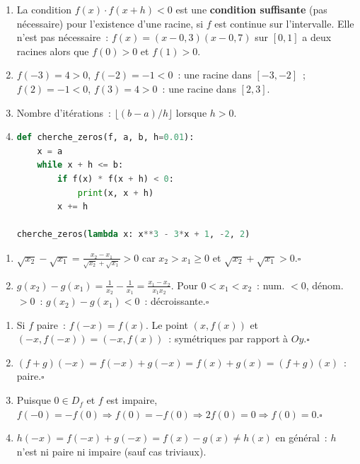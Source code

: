 \begin{enumerate}
  \item La condition $f(x)\cdot f(x+h)<0$ est une \textbf{condition suffisante} (pas n\'ecessaire)
        pour l'existence d'une racine, si $f$ est continue sur l'intervalle.
        Elle n'est pas n\'ecessaire~: $f(x)=(x-0{,}3)(x-0{,}7)$ sur $[0,1]$
        a deux racines alors que $f(0)>0$ et $f(1)>0$.
  \item $f(-3)=4>0$, $f(-2)=-1<0$~: une racine dans $[-3,-2]$~;
        $f(2)=-1<0$, $f(3)=4>0$~: une racine dans $[2,3]$.
  \item Nombre d'it\'erations~: $\lfloor(b-a)/h\rfloor$ lorsque $h>0$.
  \item
\begin{lstlisting}[language=Python]
def cherche_zeros(f, a, b, h=0.01):
    x = a
    while x + h <= b:
        if f(x) * f(x + h) < 0:
            print(x, x + h)
        x += h

cherche_zeros(lambda x: x**3 - 3*x + 1, -2, 2)
\end{lstlisting}
\end{enumerate}


\begin{enumerate}
  \item $\sqrt{x_2}-\sqrt{x_1}=\frac{x_2-x_1}{\sqrt{x_2}+\sqrt{x_1}}>0$
        car $x_2>x_1\geq0$ et $\sqrt{x_2}+\sqrt{x_1}>0$.\hfill$\square$
  \item $g(x_2)-g(x_1)=\frac{1}{x_2}-\frac{1}{x_1}=\frac{x_1-x_2}{x_1x_2}$.
        Pour $0<x_1<x_2$~: num. $<0$, d\'enom. $>0$~: $g(x_2)-g(x_1)<0$~: d\'ecroissante.\hfill$\square$
\end{enumerate}


\begin{enumerate}
  \item Si $f$ paire~: $f(-x)=f(x)$. Le point $(x,f(x))$ et $(-x,f(-x))=(-x,f(x))$~:
        sym\'etriques par rapport \`a $Oy$.\hfill$\square$
  \item $(f+g)(-x)=f(-x)+g(-x)=f(x)+g(x)=(f+g)(x)$~: paire.\hfill$\square$
  \item Puisque $0\in D_f$ et $f$ est impaire, $f(-0)=-f(0)\Rightarrow f(0)=-f(0)\Rightarrow2f(0)=0\Rightarrow f(0)=0$.\hfill$\square$
  \item $h(-x)=f(-x)+g(-x)=f(x)-g(x)\ne h(x)$ en g\'en\'eral~:
        $h$ n'est ni paire ni impaire (sauf cas triviaux).
\end{enumerate}

